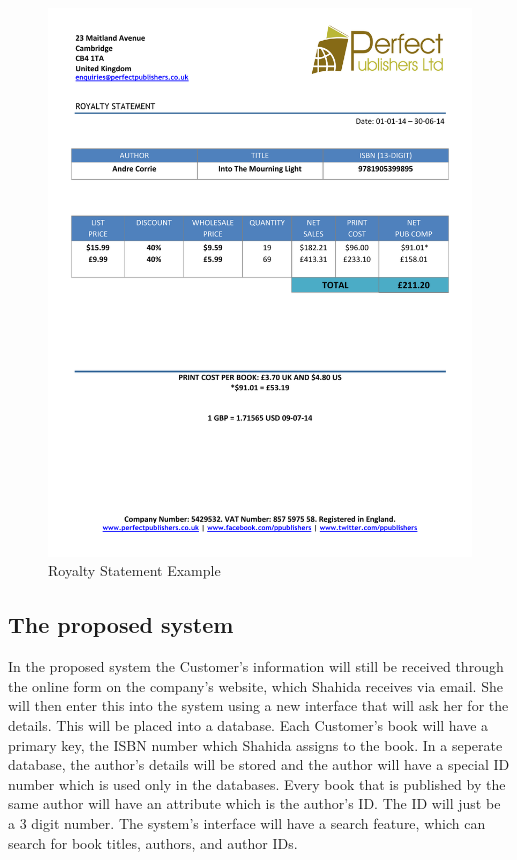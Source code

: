 \begin{figure}[H]
    \includegraphics[width=\textwidth]{./Analysis/Royalty_Statement_Example.pdf}
    \caption{Royalty Statement Example} \label{Royalty_Statement_Example.pdf}
\end{figure}

\subsection{The proposed system}

In the proposed system the Customer's information will still be received through the online form on the company's website, which Shahida receives via email. She will then enter this into the system using a new interface that will ask her for the details. This will be placed into a database. Each Customer's book will have a primary key, the ISBN number which Shahida assigns to the book. In a seperate database, the author's details will be stored and the author will have a special ID number which is used only in the databases. Every book that is published by the same author will have an attribute which is the author's ID. The ID will just be a 3 digit number. The system's interface will have a search feature, which can search for book titles, authors, and author IDs.

